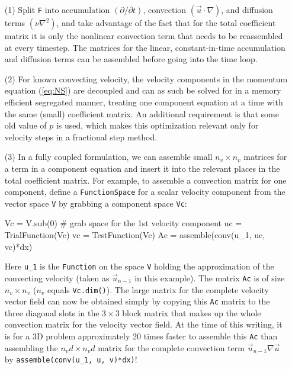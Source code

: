 \begin{itemize}
 \item[(1)] Split {\fontsize{12pt}{12pt}\texttt{F}} into accumulation $(\partial /\partial t)$,
convection $(\vec{u}\cdot\nabla)$, and diffusion terms
$(\nu\nabla^2)$, and take advantage of the fact that for the total
coefficient matrix it is only the nonlinear convection term that needs
to be reassembled at every timestep. The matrices for the linear,
constant-in-time accumulation and diffusion terms can be assembled
before going into the time loop.

\item[(2)] For known convecting velocity,
 the velocity components in the momentum equation (\ref{eq:NS})
 are decoupled and can as such be solved for in a
 memory efficient segregated manner, treating one component equation
 at a time with the same (small) coefficient matrix. An additional requirement is that some old value of $p$ is used,
 which makes this optimization relevant only for velocity steps in
 a fractional step method.

\item[(3)]
 In a fully coupled formulation,
 we can assemble small $n_v\times n_v$ matrices for a term in a
 component equation and insert it into the relevant places in
 the total coefficient matrix.
 For example, to assemble a convection matrix for one component, define
 a {\fontsize{12pt}{12pt}\texttt{FunctionSpace}} for a scalar velocity component from the
 vector space {\fontsize{12pt}{12pt}\texttt{V}} by grabbing a component space {\fontsize{12pt}{12pt}\texttt{Vc}}:
\begin{python}
Vc = V.sub(0)  # grab space for the 1st velocity component
uc = TrialFunction(Vc)
vc = TestFunction(Vc)
Ac = assemble(conv(u_1, uc, vc)*dx)
\end{python}
Here {\fontsize{12pt}{12pt}\verb!u_1!} is the {\fontsize{12pt}{12pt}\texttt{Function}} on the space {\fontsize{12pt}{12pt}\texttt{V}}
holding the approximation of the
convecting velocity (taken as $\vec{u}_{n-1}$ in this example).
The matrix {\fontsize{12pt}{12pt}\texttt{Ac}} is of size $n_v\times n_v$ ($n_v$ equals
{\fontsize{12pt}{12pt}\texttt{Vc.dim()}}).
The large matrix for the complete velocity vector field can now be
obtained simply by copying this {\fontsize{12pt}{12pt}\texttt{Ac}} matrix to the three diagonal
slots in the $3\times 3$ block matrix that makes up the whole
convection matrix for the velocity vector field.  At the time of this
writing, it is for a 3D problem approximately 20 times faster to
assemble this {\fontsize{12pt}{12pt}\texttt{Ac}} than assembling the $n_vd\times n_vd$ matrix
for the complete convection term $\vec{u}_{n-1}\nabla
\vec{u}$ by {\fontsize{12pt}{12pt}\verb!assemble(conv(u_1, u, v)*dx)!}!


\end{itemize}
